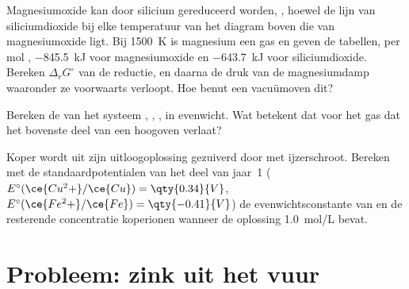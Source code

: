 \begin{exercise}[$\star\star\star$]\label{exo:b2:ellingham:10}
Magnesiumoxide kan door silicium gereduceerd worden, , hoewel
de lijn van siliciumdioxide bij elke temperatuur van het diagram boven die van magnesiumoxide ligt.
Bij \qty{1500}{K} is magnesium een gas en geven de tabellen, per mol
, \qty{-845.5}{kJ} voor magnesiumoxide en \qty{-643.7}{kJ} voor siliciumdioxide.
Bereken $\Delta_r G^\circ$ van de reductie, en daarna de druk van de magnesiumdamp
waaronder ze voorwaarts verloopt. Hoe benut een vacuümoven dit?
\end{exercise}

\begin{exercise}[$\star\star\star$]\label{exo:b2:ellingham:11}
Bereken de  van het systeem , , ,
 in evenwicht. Wat betekent dat voor het gas dat het bovenste deel
van een hoogoven verlaat?
\end{exercise}

\begin{exercise}[$\star\star\star$]\label{exo:b2:ellingham:12}
Koper wordt uit zijn uitloogoplossing gezuiverd door  met ijzerschroot.
Bereken met de standaardpotentialen van het deel van jaar~1 ($E^\circ(\ce{Cu^2+}/\ce{Cu})
= \qty{0.34}{V}$, $E^\circ(\ce{Fe^2+}/\ce{Fe}) = \qty{-0.41}{V}$) de
evenwichtsconstante van  en de resterende
concentratie koperionen wanneer de oplossing \qty{1.0}{mol/L}
 bevat.
\end{exercise}

\section{Probleem: zink uit het vuur}

